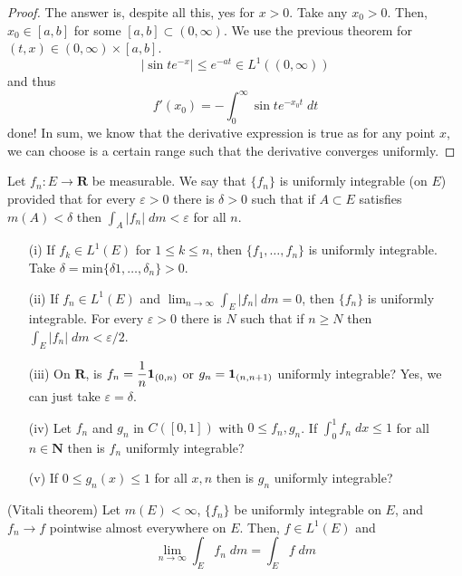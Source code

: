 \vspace{2ex}
\begin{proof}
The answer is, despite all this, yes for $x>0$. Take any $x_0>0$. Then, $x_0\in [a,b]$ for some $[a,b]\subset (0,\infty )$. We use the previous theorem for $(t,x)\in (0,\infty )\times [a,b]$. 
\[|\sin t e^{-x}|\leq e^{-at}\in L^{1}((0,\infty ))\]
and thus 
\[f'(x_0)=-\int _{0}^{\infty }\sin te^{-x_0t}\;dt\]
done! In sum, we know that the derivative expression is true as for any point $x$, we can choose is a certain range such that the derivative converges uniformly. 
\end{proof}
\vspace{2ex}
\begin{defi}
Let $f_{n}:E\rightarrow {\bm R}$ be measurable. We say that $\{f_{n}\}$ is uniformly integrable (on $E$) provided that for every $\varepsilon >0$ there is $\delta >0$ such that if $A\subset E$ satisfies $m(A)<\delta $ then $\int _{A}|f_{n}|\;d m<\varepsilon $ for all $n$. 
\end{defi}
\vspace{2ex}
\begin{ex}
\begin{itemize}
\item[(i)] If $f_{k}\in L^{1}(E)$ for $1\leq k \leq n$, then $\{f_1,\ldots ,f_{n}\}$ is uniformly integrable. Take $\delta =\mathrm{min}\{\delta 1,\ldots ,\delta _{n}\}>0$. 
\item[(ii)] If $f_{n}\in L^{1}(E)$ and $\lim _{n\rightarrow \infty }\int _{E}|f_{n}|\;d m=0$, then $\{f_{n}\}$ is uniformly integrable. For every $\varepsilon >0$ there is $N$ such that if $n\geq N$ then $\int _{E}|f_{n}|\;d m<\varepsilon /2$. 
\item[(iii)] On ${\bm R}$, is $f_{n}=\dfrac{1}{n}{\bf 1}_{(0,n)}$ or $g_{n}={\bf 1}_{(n,n+1)}$ uniformly integrable? Yes, we can just take $\varepsilon =\delta $.
\item[(iv)] Let $f_{n}$ and $g_{n}$ in $C([0,1])$ with $0\leq f_{n}, g_{n}$. If $\int ^{1}_{0}f_{n}\;dx\leq 1$ for all $n\in {\bm N}$ then is $f_{n}$ uniformly integrable? 
\item[(v)] If $0\leq g_{n}(x)\leq 1$ for all $x,n$ then is $g_{n}$ uniformly integrable?
\end{itemize}
\end{ex}
\vspace{2ex}
 \begin{thm}
 (Vitali theorem) Let $m(E)<\infty $, $\{f_{n}\}$ be uniformly integrable on $E$, and $f_{n}\rightarrow f$ pointwise almost everywhere on $E$. Then, $f\in L^{1}(E)$ and
 \[\lim _{n\rightarrow \infty }\int _{E}f_{n}\;d m=\int _{E}f\;d m\] 
 \end{thm}
